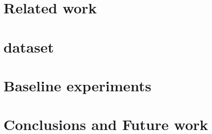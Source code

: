 \documentclass[runningheads]{llncs}
\begin{document}
\section{Related work}
\label{sec:related}


\section{\dbname dataset}
\label{sec:dataset}


\section{Baseline experiments} 
\label{sec:experiments}


\section{Conclusions and Future work}
\label{sec:conclusions}



%
%
%


\end{document}

